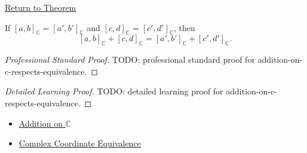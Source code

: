 \newpage
{}
\label{prf:addition-on-c-respects-equivalence}

\begin{remark*}[Return]
\hyperref[lem:addition-on-c-respects-equivalence]{Return to Theorem}
\end{remark*}

\begin{lemma*}
If $[a,b]_{\mathbb{C}}=[a',b']_{\mathbb{C}}$ and
$[c,d]_{\mathbb{C}}=[c',d']_{\mathbb{C}}$, then
\[
[a,b]_{\mathbb{C}}+[c,d]_{\mathbb{C}}
=
[a',b']_{\mathbb{C}}+[c',d']_{\mathbb{C}}.
\]
\end{lemma*}

\begin{proof}[Professional Standard Proof]
\LRAProofBodyStart
TODO: professional standard proof for addition-on-c-respects-equivalence.
\end{proof}

\begin{proof}[Detailed Learning Proof]
\LRAProofBodyStart
TODO: detailed learning proof for addition-on-c-respects-equivalence.
\end{proof}

\begin{remark*}
\end{remark*}

\begin{dependencies}
\begin{itemize}
  \item \hyperref[def:addition-on-c-classes]{Addition on $\mathbb{C}$}
  \item \hyperref[def:complex-coordinate-equivalence]{Complex Coordinate Equivalence}
\end{itemize}
\end{dependencies}

\clearpage
